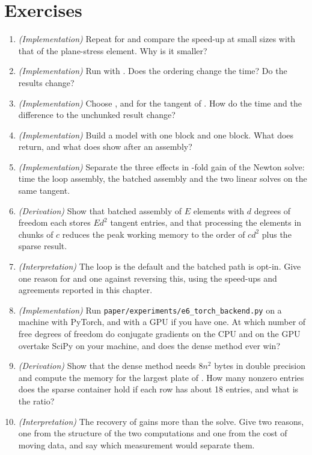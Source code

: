 \section*{Exercises}\label{sec:bk-exercises}
\begin{enumerate}
\item \emph{(Implementation)} Repeat  for  and compare the speed-up at small sizes with that of the plane-stress element. Why is it smaller?
\item \emph{(Implementation)} Run  with . Does the ordering change the time? Do the results change?
\item \emph{(Implementation)} Choose ,  and  for the tangent of . How do the time and the difference to the unchunked result change?
\item \emph{(Implementation)} Build a model with one  block and one  block. What does  return, and what does  show after an assembly?
\item \emph{(Implementation)} Separate the three effects in \cbkNewtonRatio{}-fold gain of the Newton solve: time the loop assembly, the batched assembly and the two linear solves on the same tangent.
\item \emph{(Derivation)} Show that batched assembly of $E$ elements with $d$ degrees of freedom each stores $Ed^2$ tangent entries, and that processing the elements in chunks of $c$ reduces the peak working memory to the order of $cd^2$ plus the sparse result.
\item \emph{(Interpretation)} The loop is the default and the batched path is opt-in. Give one reason for and one against reversing this, using the speed-ups and agreements reported in this chapter.
\item \emph{(Implementation)} Run \texttt{paper/experiments/e6\_torch\_backend.py} on a machine with PyTorch, and with a GPU if you have one. At which number of free degrees of freedom do conjugate gradients on the CPU and on the GPU overtake SciPy on your machine, and does the dense method ever win?
\item \emph{(Derivation)} Show that the dense method needs $8n^2$ bytes in double precision and compute the memory for the largest plate of . How many nonzero entries does the sparse container hold if each row has about 18 entries, and what is the ratio?
\item \emph{(Interpretation)} The recovery of  gains more than the solve. Give two reasons, one from the structure of the two computations and one from the cost of moving data, and say which measurement would separate them.
\end{enumerate}

\chapterrefs
